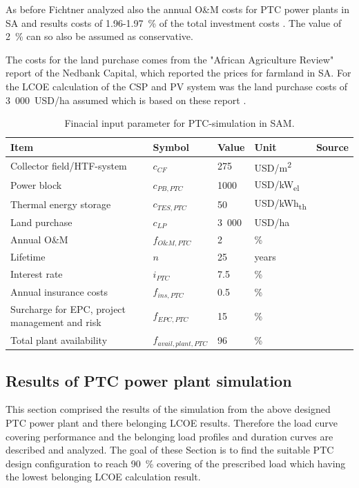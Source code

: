 As before Fichtner analyzed also the annual O\&M costs for PTC power plants in SA and results costs of 1.96-1.97~\% of the total investment costs \cite{Fichtner2010}. The value of 2~\% can so also be assumed as conservative.

The costs for the land purchase comes from the "African Agriculture Review" report of the Nedbank Capital, which reported the prices for farmland in SA. For the LCOE calculation of the CSP and PV system was the land purchase costs of 3~000~USD/ha assumed which is based on these report \cite{Cassell2012}.
\begin{table}[!h]  
  \centering
	\begin{tabular}{  p{5.0cm} C{2.0cm} C{1.5cm}  C{1.5cm}  C{4.0cm} } 
	\hline	
\textbf{Item} & \textbf{Symbol}& \textbf{Value} & \textbf{Unit} & \textbf{Source}\\ \hline \hline
Collector field/HTF-system & $c_{CF}$ & 275 & USD/m\textsuperscript{2} & \cite{Morin2012}\\ 
Power block &$c_{PB,PTC}$ & 1000 & USD/kW\textsubscript{el} & \cite{Platzer2014}\\ 
Thermal energy storage & $c_{TES,PTC}$ & 50 & USD/kWh\textsubscript{th} & \cite{Platzer2014}\\ 
Land purchase & $c_{LP}$ & 3~000 & USD/ha & \cite{Cassell2012} \\ 
Annual O\&M & $f_{O\&M,PTC}$ & 2 & \% &\cite{Fichtner2010}\\ 
\hline
Lifetime&$n$ & 25 & years & \cite{FraunhoferISE2013} \\ 
Interest rate& $i_{PTC}$& 7.5 & \% & \cite{FraunhoferISE2013} \\ 
Annual insurance costs& $f_{ins,PTC}$ & 0.5 & \% & \cite{IRENA2012}\\
Surcharge for EPC, project management and risk & $f_{EPC,PTC}$ & 15 & \% & \cite{Platzer2014} \\
Total plant availability &$f_{avail,plant,PTC}$ & 96 & \% & \cite{Morin2012} \\ 
\hline
\end{tabular}
\caption[Finacial input parameter for PTC-simulation in SAM.]{Finacial input parameter for PTC-simulation in SAM.}\label{tbl: PTCFinance}
\end{table}
\subsection{Results of PTC power plant simulation} \label{sec.resultsPTC}
This section comprised the results of the simulation from the above designed PTC power plant and there belonging LCOE results. Therefore the load curve covering performance and the belonging load profiles and duration curves are described and analyzed. The goal of these Section is to find the suitable PTC design configuration to reach 90~\% covering of the prescribed load which having the lowest belonging LCOE calculation result.
